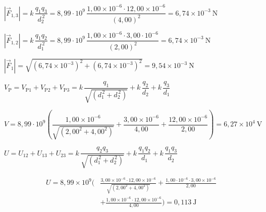 \begin{solapartat}
 $\left|\vec{F}_{1,3}\right| = k\,\dfrac{q_1q_3}{d_2^{\,2}} = 8,99\cdot 10^{9}\,\dfrac{1,00\times 10^{-6}\cdot 12,00\times 10^{-6}}{(4,00)^2} = 6,74\times 10^{-3}\ \mathrm{N}$

 $\left|\vec{F}_{1,2}\right| = k\,\dfrac{q_1q_2}{d_1^{\,2}} = 8,99\cdot 10^{9}\,\dfrac{1,00\times 10^{-6}\cdot 3,00\cdot 10^{-6}}{(2,00)^2} = 6,74\times 10^{-3}\ \mathrm{N}$

 $\left|\vec{F}_{1}\right| = \sqrt{\left(6,74\times 10^{-3}\right)^2 + \left(6,74\times 10^{-3}\right)^2} = 9,54\times 10^{-3}\ \mathrm{N}$

\end{solapartat}

\begin{solapartat}
 $V_\mathrm{P} = V_\mathrm{P1} + V_\mathrm{P2} + V_\mathrm{P3} = k\,\dfrac{q_1}{\sqrt{\left(d_1^{\,2} + d_2^{\,2}\right)}} + k\,\dfrac{q_2}{d_2} + k\,\dfrac{q_3}{d_1}$

\[ V = 8,99\cdot 10^{9}\left(\frac{1,00\times 10^{-6}}{\sqrt{\left(2,00^2 + 4,00^2\right)}} + \frac{3,00\times 10^{-6}}{4,00} + \frac{12,00\times 10^{-6}}{2,00}\right) = 6,27\times 10^{4}\ \mathrm{V} \]

 $U = U_{12} + U_{13} + U_{23} = k\,\dfrac{q_2q_3}{\sqrt{\left(d_1^{\,2} + d_2^{\,2}\right)}} + k\,\dfrac{q_1q_2}{d_1} + k\,\dfrac{q_1q_3}{d_2}$

\begin{align*}
U = 8,99\times 10^{9}\biggl(&\frac{3,00\times 10^{-6}\cdot 12,00\times 10^{-6}}{\sqrt{\left(2,00^2 + 4,00^2\right)}} + \frac{1,00\cdot 10^{-6}\cdot 3,00\times 10^{-6}}{2,00}\\
&+ \frac{1,00\times 10^{-6}\cdot 12,00\times 10^{-6}}{4,00}\biggr) = 0,113\ \mathrm{J}
\end{align*}
\end{solapartat}
